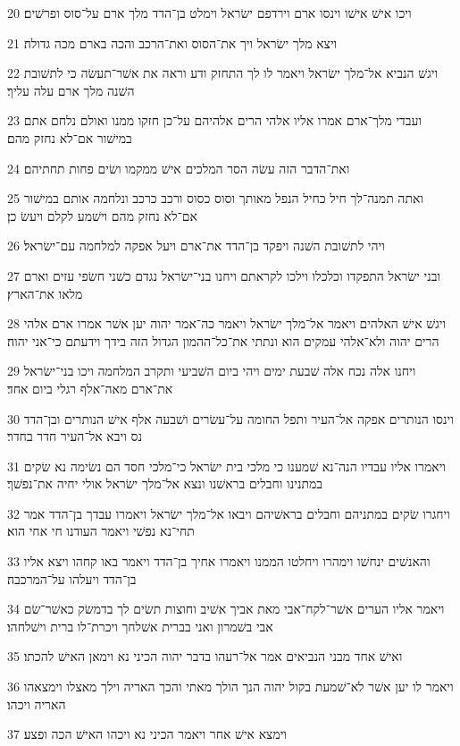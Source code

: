 \par 20 ויכו אישׁ אישׁו וינסו ארם וירדפם ישׂראל וימלט בן־הדד מלך ארם על־סוס ופרשׁים׃
\par 21 ויצא מלך ישׂראל ויך את־הסוס ואת־הרכב והכה בארם מכה גדולה׃
\par 22 ויגשׁ הנביא אל־מלך ישׂראל ויאמר לו לך התחזק ודע וראה את אשׁר־תעשׂה כי לתשׁובת השׁנה מלך ארם עלה עליך׃
\par 23 ועבדי מלך־ארם אמרו אליו אלהי הרים אלהיהם על־כן חזקו ממנו ואולם נלחם אתם במישׁור אם־לא נחזק מהם׃
\par 24 ואת־הדבר הזה עשׂה הסר המלכים אישׁ ממקמו ושׂים פחות תחתיהם׃
\par 25 ואתה תמנה־לך חיל כחיל הנפל מאותך וסוס כסוס ורכב כרכב ונלחמה אותם במישׁור אם־לא נחזק מהם וישׁמע לקלם ויעשׂ כן׃
\par 26 ויהי לתשׁובת השׁנה ויפקד בן־הדד את־ארם ויעל אפקה למלחמה עם־ישׂראל׃
\par 27 ובני ישׂראל התפקדו וכלכלו וילכו לקראתם ויחנו בני־ישׂראל נגדם כשׁני חשׂפי עזים וארם מלאו את־הארץ׃
\par 28 ויגשׁ אישׁ האלהים ויאמר אל־מלך ישׂראל ויאמר כה־אמר יהוה יען אשׁר אמרו ארם אלהי הרים יהוה ולא־אלהי עמקים הוא ונתתי את־כל־ההמון הגדול הזה בידך וידעתם כי־אני יהוה׃
\par 29 ויחנו אלה נכח אלה שׁבעת ימים ויהי ביום השׁביעי ותקרב המלחמה ויכו בני־ישׂראל את־ארם מאה־אלף רגלי ביום אחד׃
\par 30 וינסו הנותרים אפקה אל־העיר ותפל החומה על־עשׂרים ושׁבעה אלף אישׁ הנותרים ובן־הדד נס ויבא אל־העיר חדר בחדר׃
\par 31 ויאמרו אליו עבדיו הנה־נא שׁמענו כי מלכי בית ישׂראל כי־מלכי חסד הם נשׂימה נא שׂקים במתנינו וחבלים בראשׁנו ונצא אל־מלך ישׂראל אולי יחיה את־נפשׁך׃
\par 32 ויחגרו שׂקים במתניהם וחבלים בראשׁיהם ויבאו אל־מלך ישׂראל ויאמרו עבדך בן־הדד אמר תחי־נא נפשׁי ויאמר העודנו חי אחי הוא׃
\par 33 והאנשׁים ינחשׁו וימהרו ויחלטו הממנו ויאמרו אחיך בן־הדד ויאמר באו קחהו ויצא אליו בן־הדד ויעלהו על־המרכבה׃
\par 34 ויאמר אליו הערים אשׁר־לקח־אבי מאת אביך אשׁיב וחוצות תשׂים לך בדמשׂק כאשׁר־שׂם אבי בשׁמרון ואני בברית אשׁלחך ויכרת־לו ברית וישׁלחהו׃
\par 35 ואישׁ אחד מבני הנביאים אמר אל־רעהו בדבר יהוה הכיני נא וימאן האישׁ להכתו׃
\par 36 ויאמר לו יען אשׁר לא־שׁמעת בקול יהוה הנך הולך מאתי והכך האריה וילך מאצלו וימצאהו האריה ויכהו׃
\par 37 וימצא אישׁ אחר ויאמר הכיני נא ויכהו האישׁ הכה ופצע׃
